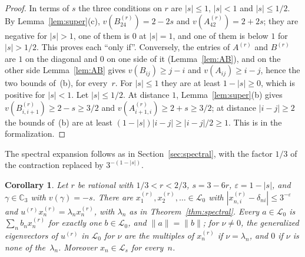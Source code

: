 \documentclass[11pt]{amsart}
\newtheorem{corollary}[theorem]{Corollary}
\theoremstyle{definition}
\numberwithin{equation}{section}
\newcommand{\lean}[1]{\ignorespaces}
\newcommand{\Cp}{\mathbb{C}_3}
\newcommand{\cL}{\mathcal{L}}
\newcommand{\Lc}{\mathcal{L}_0}
\begin{document}
\begin{proof}
In terms of $s$ the three conditions on $r$ are $|s|\le1$, $|s|<1$ and $|s|\le1/2$. By Lemma~\ref{lem:super}(c), $v(B^{(r)}_{24})=2-2s$ and $v(A^{(r)}_{42})=2+2s$; they are negative for $|s|>1$, one of them is $0$ at $|s|=1$, and one of them is below $1$ for $|s|>1/2$. This proves each ``only if''. Conversely, the entries of $A^{(r)}$ and $B^{(r)}$ are $1$ on the diagonal and $0$ on one side of it (Lemma~\ref{lem:AB}), and on the other side Lemma~\ref{lem:AB} gives $v(B_{ij})\ge j-i$ and $v(A_{ij})\ge i-j$, hence the two bounds of~(b), for every~$r$. For $|s|\le1$ they are at least $1-|s|\ge0$, which is positive for $|s|<1$. Let $|s|\le1/2$. At distance $1$, Lemma~\ref{lem:super}(b) gives $v(B^{(r)}_{i,i+1})\ge2-s\ge3/2$ and $v(A^{(r)}_{i+1,i})\ge2+s\ge3/2$; at distance $|i-j|\ge2$ the bounds of~(b) are at least $(1-|s|)|i-j|\ge|i-j|/2\ge1$. This is  in the formalization.
\end{proof}

The spectral expansion follows as in Section~\ref{sec:spectral}, with the factor $1/3$ of the contraction replaced by $3^{-(1-|s|)}$.

\begin{corollary}\label{cor:expansion}\lean{CalegariSlopes.Conj5.spectral_expansion, CalegariSlopes.Conj5.x_mem_L, CalegariSlopes.Conj5.exists_gamma, CalegariSlopes.Conj5.Ur_kact_Ag, CalegariSlopes.Conj5.chyp_Cg, CalegariSlopes.Conj5.CHyp.exists_eigen, CalegariSlopes.Conj5.exists_eigvec_r, CalegariSlopes.Conj5.diag_of_termwise, CalegariSlopes.Conj5.NearBasis.existsUnique_expand, CalegariSlopes.Conj5.NearBasis.iSup_norm_expand, CalegariSlopes.Conj5.identify}
Let $r$ be rational with $1/3<r<2/3$, $s=3-6r$, $\varepsilon=1-|s|$, and $\gamma\in\Cp$ with $v(\gamma)=-s$. There are $x^{(r)}_1,x^{(r)}_2,\ldots\in\Lc$ with $|x^{(r)}_{n,i}-\delta_{ni}|\le3^{-\varepsilon}$ and $u^{(r)}x^{(r)}_n=\lambda_nx^{(r)}_n$, with $\lambda_n$ as in Theorem~\ref{thm:spectral}. Every $a\in\Lc$ is $\sum_nb_nx^{(r)}_n$ for exactly one $b\in\Lc$, and $\|a\|=\|b\|$; for $\nu\ne0$, the generalized eigenvectors of $u^{(r)}$ in $\Lc$ for $\nu$ are the multiples of $x^{(r)}_n$ if $\nu=\lambda_n$, and $0$ if $\nu$ is none of the~$\lambda_n$. Moreover $x_n\in\cL_s$ for every~$n$.
\end{corollary}
\end{document}
